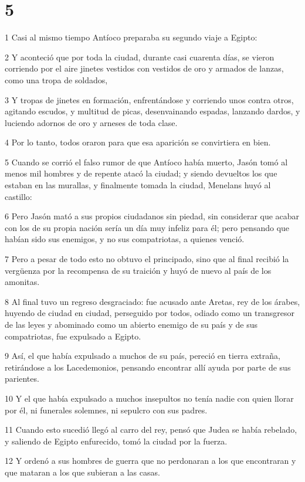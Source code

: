 \chapter{5}

\par 1 Casi al mismo tiempo Antíoco preparaba su segundo viaje a Egipto:
\par 2 Y aconteció que por toda la ciudad, durante casi cuarenta días, se vieron corriendo por el aire jinetes vestidos con vestidos de oro y armados de lanzas, como una tropa de soldados,
\par 3 Y tropas de jinetes en formación, enfrentándose y corriendo unos contra otros, agitando escudos, y multitud de picas, desenvainando espadas, lanzando dardos, y luciendo adornos de oro y arneses de toda clase.
\par 4 Por lo tanto, todos oraron para que esa aparición se convirtiera en bien.
\par 5 Cuando se corrió el falso rumor de que Antíoco había muerto, Jasón tomó al menos mil hombres y de repente atacó la ciudad; y siendo devueltos los que estaban en las murallas, y finalmente tomada la ciudad, Menelans huyó al castillo:
\par 6 Pero Jasón mató a sus propios ciudadanos sin piedad, sin considerar que acabar con los de su propia nación sería un día muy infeliz para él; pero pensando que habían sido sus enemigos, y no sus compatriotas, a quienes venció.
\par 7 Pero a pesar de todo esto no obtuvo el principado, sino que al final recibió la vergüenza por la recompensa de su traición y huyó de nuevo al país de los amonitas.
\par 8 Al final tuvo un regreso desgraciado: fue acusado ante Aretas, rey de los árabes, huyendo de ciudad en ciudad, perseguido por todos, odiado como un transgresor de las leyes y abominado como un abierto enemigo de su país y de sus compatriotas, fue expulsado a Egipto.
\par 9 Así, el que había expulsado a muchos de su país, pereció en tierra extraña, retirándose a los Lacedemonios, pensando encontrar allí ayuda por parte de sus parientes.
\par 10 Y el que había expulsado a muchos insepultos no tenía nadie con quien llorar por él, ni funerales solemnes, ni sepulcro con sus padres.
\par 11 Cuando esto sucedió llegó al carro del rey, pensó que Judea se había rebelado, y saliendo de Egipto enfurecido, tomó la ciudad por la fuerza.
\par 12 Y ordenó a sus hombres de guerra que no perdonaran a los que encontraran y que mataran a los que subieran a las casas.
